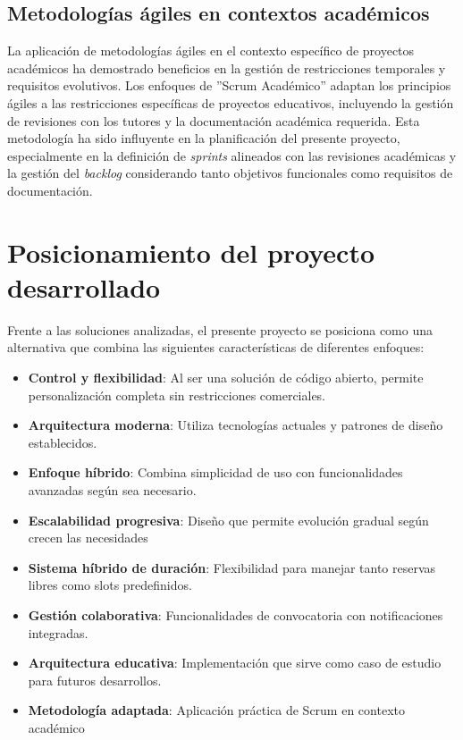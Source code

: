 \subsection{Metodologías ágiles en contextos académicos}\label{metodologias-agiles-contextos-academicos}
La aplicación de metodologías ágiles en el contexto específico de proyectos académicos ha demostrado beneficios en la gestión de restricciones temporales y requisitos evolutivos. Los enfoques de ''Scrum Académico'' adaptan los principios ágiles a las restricciones específicas de proyectos educativos, incluyendo la gestión de revisiones con los tutores y la documentación académica requerida.
Esta metodología ha sido influyente en la planificación del presente proyecto, especialmente en la definición de \emph{sprints} alineados con las revisiones académicas y la gestión del \emph{backlog} considerando tanto objetivos funcionales como requisitos de documentación.\\

\section{Posicionamiento del proyecto desarrollado}\label{posicionamiento-proyecto-desarrollado}
Frente a las soluciones analizadas, el presente proyecto se posiciona como una alternativa que combina las siguientes características de diferentes enfoques:
\begin{itemize}
\tightlist
\item
\textbf{Control y flexibilidad}: Al ser una solución de código abierto, permite personalización completa sin restricciones comerciales.
\item
\textbf{Arquitectura moderna}: Utiliza tecnologías actuales y patrones de diseño establecidos.
\item
\textbf{Enfoque híbrido}: Combina simplicidad de uso con funcionalidades avanzadas según sea necesario.
\item
\textbf{Escalabilidad progresiva}: Diseño que permite evolución gradual según crecen las necesidades
\item
\textbf{Sistema híbrido de duración}: Flexibilidad para manejar tanto reservas libres como slots predefinidos.
\item
\textbf{Gestión colaborativa}: Funcionalidades de convocatoria con notificaciones integradas.
\item
\textbf{Arquitectura educativa}: Implementación que sirve como caso de estudio para futuros desarrollos.
\item
\textbf{Metodología adaptada}: Aplicación práctica de Scrum en contexto académico
\end{itemize}
